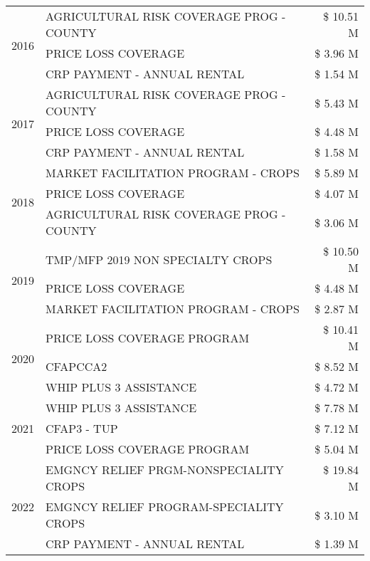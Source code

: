 \begin{tabular}{llr}
\cline{1-3}
\multirow[t]{3}{*}{2016} & AGRICULTURAL RISK COVERAGE PROG - COUNTY & \$ 10.51 M \\
 & PRICE LOSS COVERAGE & \$ 3.96 M \\
 & CRP PAYMENT - ANNUAL RENTAL & \$ 1.54 M \\
\cline{1-3}
\multirow[t]{3}{*}{2017} & AGRICULTURAL RISK COVERAGE PROG - COUNTY & \$ 5.43 M \\
 & PRICE LOSS COVERAGE & \$ 4.48 M \\
 & CRP PAYMENT - ANNUAL RENTAL & \$ 1.58 M \\
\cline{1-3}
\multirow[t]{3}{*}{2018} & MARKET FACILITATION PROGRAM - CROPS & \$ 5.89 M \\
 & PRICE LOSS COVERAGE & \$ 4.07 M \\
 & AGRICULTURAL RISK COVERAGE PROG - COUNTY & \$ 3.06 M \\
\cline{1-3}
\multirow[t]{3}{*}{2019} & TMP/MFP 2019 NON SPECIALTY CROPS & \$ 10.50 M \\
 & PRICE LOSS COVERAGE & \$ 4.48 M \\
 & MARKET FACILITATION PROGRAM - CROPS & \$ 2.87 M \\
\cline{1-3}
\multirow[t]{3}{*}{2020} & PRICE LOSS COVERAGE PROGRAM & \$ 10.41 M \\
 & CFAPCCA2 & \$ 8.52 M \\
 & WHIP PLUS 3 ASSISTANCE & \$ 4.72 M \\
\cline{1-3}
\multirow[t]{3}{*}{2021} & WHIP PLUS 3 ASSISTANCE & \$ 7.78 M \\
 & CFAP3 - TUP & \$ 7.12 M \\
 & PRICE LOSS COVERAGE PROGRAM & \$ 5.04 M \\
\cline{1-3}
\multirow[t]{3}{*}{2022} & EMGNCY RELIEF PRGM-NONSPECIALITY CROPS & \$ 19.84 M \\
 & EMGNCY RELIEF PROGRAM-SPECIALITY CROPS & \$ 3.10 M \\
 & CRP PAYMENT - ANNUAL RENTAL & \$ 1.39 M \\
\cline{1-3}
\bottomrule
\end{tabular}
